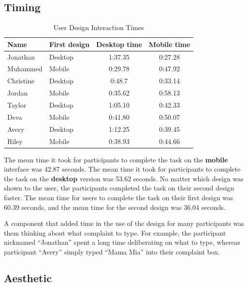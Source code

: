 \documentclass{article}
\begin{document}
\subsection{Timing}

\begin{table}[ht]
\centering
\caption{User Design Interaction Times}
\begin{tabular}{llcc}
\toprule
Name & First design & Desktop time & Mobile time \\
\midrule
Jonathan & Desktop & 1:37.35 & 0:27.28 \\
Muhammed & Mobile & 0:29.78 & 0:47.92 \\
Christine & Desktop & 0:48.7 & 0:33.14 \\
Jordan & Mobile & 0:35.62 & 0:58.13 \\
Taylor & Desktop & 1:05.10 & 0:42.33 \\
Deva & Mobile & 0:41.80 & 0:50.07 \\
Avery & Desktop & 1:12.25 & 0:39.45 \\
Riley & Mobile & 0:38.93 & 0:44.66 \\
\bottomrule
\end{tabular}
\end{table}

The mean time it took for participants to complete the task on the \textbf{mobile} interface was 42.87 seconds. The mean time it took for participants to complete the task on the \textbf{desktop} version was 53.62 seconds. No matter which design was shown to the user, the participants completed the task on their second design faster. The mean time for users to complete the task on their first design was 60.39 seconds, and the mean time for the second design was 36.04 seconds.

A component that added time in the use of the design for many participants was them thinking about what complaint to type. For example, the participant nicknamed “Jonathan” spent a long time deliberating on what to type, whereas participant “Avery” simply typed “Mama Mia” into their complaint box. 

\subsection{Aesthetic}
\end{document}
